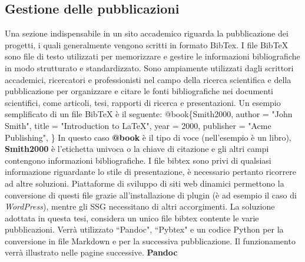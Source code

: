 \documentclass[target=bach,aauheader=]{thud}
\begin{document}
\subsection{Gestione delle pubblicazioni}
Una sezione indispensabile in un sito accademico riguarda la pubblicazione dei progetti, i quali generalmente vengono scritti in formato BibTex.
\newline
I file BibTeX sono file di testo utilizzati per memorizzare e gestire le informazioni bibliografiche in modo strutturato e standardizzato. 
Sono ampiamente utilizzati dagli scrittori accademici, ricercatori e professionisti nel campo della ricerca scientifica e della pubblicazione per organizzare e citare le fonti bibliografiche nei documenti scientifici, come articoli, tesi, rapporti di ricerca e presentazioni. 
Un esempio semplificato di un file BibTeX è il seguente:
\newline \newline
@book\{Smith2000,
\newline  author = "John Smith",
\newline  title = "Introduction to LaTeX",
\newline  year = 2000,
\newline  publisher = "Acme Publishing",
\newline \}
\newline \newline
In questo caso \textbf{@book} è il tipo di voce (nell'esempio è un libro), \textbf{Smith2000} è l'etichetta univoca o la chiave di citazione e gli altri campi contengono informazioni bibliografiche. 
\newline
I file bibtex sono privi di qualsiasi informazione riguardante lo stile di presentazione, è necessario pertanto ricorrere ad altre soluzioni. Piattaforme di sviluppo di siti web dinamici permettono la conversione di questi file grazie all'installazione di plugin (è ad esempio il caso di \textit{WordPress}), mentre gli SSG necessitano di altri accorgimenti.
\newline
La soluzione adottata in questa tesi, considera un unico file bibtex contente le varie pubblicazioni. Verrà utilizzato ``Pandoc", ``Pybtex" e un codice Python per la conversione in file Markdown e per la successiva pubblicazione. Il funzionamento verrà illustrato nelle pagine successive. 
\newline \newline
\textbf{{\fontsize{12}{14}\selectfont Pandoc}}
\newline \newline
\end{document}
